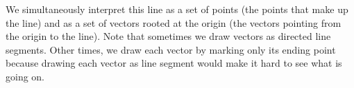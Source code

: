 \begin{center}
\end{center}
We simultaneously interpret this line as a set of points (the points that make up
the line) and as a set of vectors 
rooted at the origin (the vectors pointing from the origin to the line).
Note that sometimes we draw vectors as directed line segments.
Other times, we draw
each vector by marking only its ending point because drawing each vector as line segment
would make
it hard to see what is going on.

